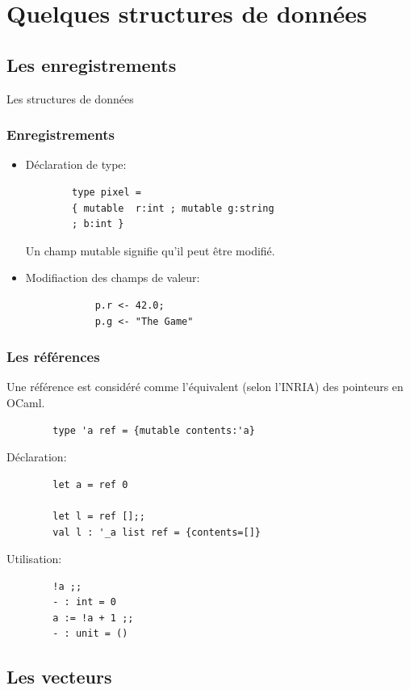 
\section{Quelques structures de données}
\subsection{Les enregistrements}

\begin{frame}
	\begin{center}
		\huge 
		Les structures de données
	\end{center}
\end{frame}


\begin{frame}[fragile]
	\frametitle{Enregistrements}
	\begin{itemize}
	\item Déclaration de type: 
		\begin{lstlisting}
		type pixel = 
		{ mutable  r:int ; mutable g:string 
		; b:int } 
		\end{lstlisting}
		Un champ mutable signifie qu'il peut être modifié.
	
	\item Modifiaction des champs de valeur:
		\begin{lstlisting}
			p.r <- 42.0;
			p.g <- "The Game"
		\end{lstlisting}
\end{itemize}
\end{frame}


\begin{frame}[fragile]
	\frametitle{Les références}
	Une référence est considéré comme l'équivalent (selon l'INRIA) des pointeurs en OCaml.
	\begin{lstlisting}
		type 'a ref = {mutable contents:'a}
	\end{lstlisting}
	Déclaration:
	\begin{lstlisting}
		let a = ref 0

		let l = ref [];;
		val l : '_a list ref = {contents=[]}
	\end{lstlisting}
	Utilisation:
	\begin{lstlisting}
		!a ;;
		- : int = 0
		a := !a + 1 ;;
		- : unit = ()
	\end{lstlisting}

\end{frame}

\subsection{Les vecteurs}

